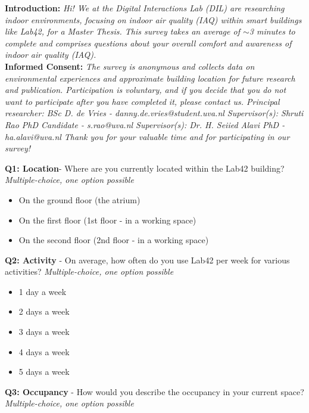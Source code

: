 \begin{appendices}
\vspace{10pt} 

\textbf{Introduction:}
\textit{Hi! We at the Digital Interactions Lab (DIL) are researching indoor environments, focusing on indoor air quality (IAQ) within smart buildings like Lab42, for a Master Thesis. This survey takes an average of $\sim$3 minutes to complete and comprises questions about your overall comfort and awareness of indoor air quality (IAQ).}\\

\textbf{Informed Consent:}
\textit{The survey is anonymous and collects data on environmental experiences and approximate building location for future research and publication. Participation is voluntary, and if you decide that you do not want to participate after you have completed it, please contact us. Principal researcher: BSc D. de Vries - danny.de.vries@student.uva.nl Supervisor(s): Shruti Rao PhD Candidate - s.rao@uva.nl Supervisor(s): Dr. H. Seiied Alavi PhD - ha.alavi@uva.nl Thank you for your valuable time and for participating in our survey!}

\vspace{10pt} 

\textbf{Q1: Location}- Where are you currently located within the Lab42 building? \textit{Multiple-choice, one option possible}

\begin{itemize}
    \item On the ground floor (the atrium)
    \item On the first floor (1st floor - in a working space)
    \item On the second floor (2nd floor - in a working space)
\end{itemize}

\textbf{Q2: Activity} - On average, how often do you use Lab42 per week for various activities? \textit{Multiple-choice, one option possible}

\begin{itemize}
    \item 1 day a week
    \item 2 days a week
    \item 3 days a week
    \item 4 days a week
    \item 5 days a week
\end{itemize}

\textbf{Q3: Occupancy} - How would you describe the occupancy in your current space? \textit{Multiple-choice, one option possible}


\end{appendices}
